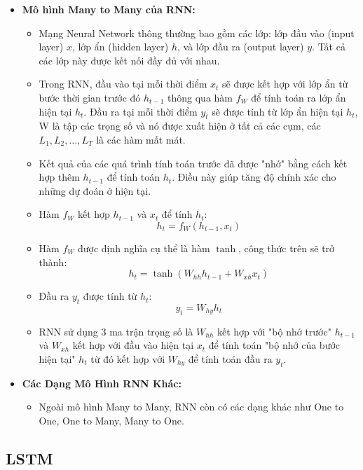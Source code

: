 \documentclass[conference]{IEEEtran}
\begin{document}
\begin{itemize}  
    \item \textbf{Mô hình Many to Many của RNN:}
    \begin{itemize}
        \item Mạng Neural Network thông thường bao gồm các lớp: lớp đầu vào (input layer) \( x \), lớp ẩn (hidden layer) \( h \), và lớp đầu ra (output layer) \( y \). Tất cả các lớp này được kết nối đầy đủ với nhau.
        \item Trong RNN, đầu vào tại mỗi thời điểm \( x_t \) sẽ được kết hợp với lớp ẩn từ bước thời gian trước đó \( h_{t-1} \) thông qua hàm \( f_W \) để tính toán ra lớp ẩn hiện tại \( h_t \). Đầu ra tại mỗi thời điểm \( y_t \) sẽ được tính từ lớp ẩn hiện tại \( h_t \), W là tập các trọng số và nó được xuất hiện ở tất cả các cụm, các \( L_1, L_2, \ldots, L_T \) là các hàm mất mát.
        \item Kết quả của các quá trình tính toán trước đã được "nhớ" bằng cách kết hợp thêm \( h_{t-1} \) để tính toán \( h_t \). Điều này giúp tăng độ chính xác cho những dự đoán ở hiện tại.
        \item Hàm \( f_W \) kết hợp \( h_{t-1} \) và \( x_t \) để tính \( h_t \):
        \[
        h_t = f_W(h_{t-1}, x_t)
        \]
        \item Hàm \( f_W \) được định nghĩa cụ thể là hàm \( \tanh \), công thức trên sẽ trở thành:
        \[
        h_t = \tanh(W_{hh}h_{t-1} + W_{xh}x_t)
        \]
        \item Đầu ra \( y_t \) được tính từ \( h_t \):
        \[
        y_t = W_{hy}h_t
        \]
        \item RNN sử dụng 3 ma trận trọng số là \( W_{hh} \) kết hợp với "bộ nhớ trước" \( h_{t-1} \) và \( W_{xh} \) kết hợp với đầu vào hiện tại \( x_t \) để tính toán "bộ nhớ của bước hiện tại" \( h_t \) từ đó kết hợp với \( W_{hy} \) để tính toán đầu ra \( y_t \).
    \end{itemize}
            
    \item \textbf{Các Dạng Mô Hình RNN Khác:}
    \begin{itemize}
        \item Ngoài mô hình Many to Many, RNN còn có các dạng khác như One to One, One to Many, Many to One.
    \end{itemize}
\end{itemize}

\subsection{LSTM}
\end{document}
